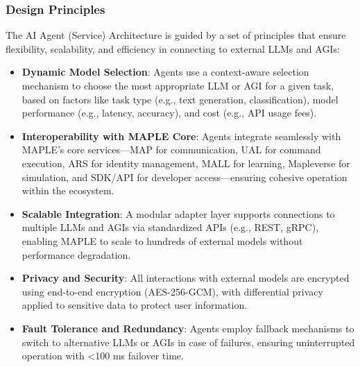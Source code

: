 \documentclass[a4paper,11pt]{article}
\begin{document}
\subsubsection{Design Principles}
The AI Agent (Service) Architecture is guided by a set of principles that ensure flexibility, scalability, and efficiency in connecting to external LLMs and AGIs:
\begin{itemize}[leftmargin=*]
    \item \textbf{Dynamic Model Selection}: Agents use a context-aware selection mechanism to choose the most appropriate LLM or AGI for a given task, based on factors like task type (e.g., text generation, classification), model performance (e.g., latency, accuracy), and cost (e.g., API usage fees).
    \item \textbf{Interoperability with MAPLE Core}: Agents integrate seamlessly with MAPLE’s core services—MAP for communication, UAL for command execution, ARS for identity management, MALL for learning, Mapleverse for simulation, and SDK/API for developer access—ensuring cohesive operation within the ecosystem.
    \item \textbf{Scalable Integration}: A modular adapter layer supports connections to multiple LLMs and AGIs via standardized APIs (e.g., REST, gRPC), enabling MAPLE to scale to hundreds of external models without performance degradation.
    \item \textbf{Privacy and Security}: All interactions with external models are encrypted using end-to-end encryption (AES-256-GCM), with differential privacy applied to sensitive data to protect user information.
    \item \textbf{Fault Tolerance and Redundancy}: Agents employ fallback mechanisms to switch to alternative LLMs or AGIs in case of failures, ensuring uninterrupted operation with <100 ms failover time.
\end{itemize}
\end{document}
